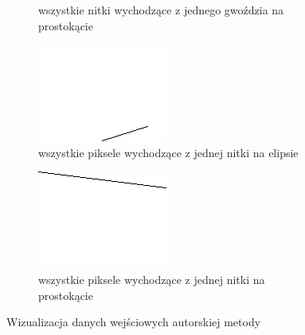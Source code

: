 \documentclass[a4paper, 12pt, polish, twoside]{extreport}
\begin{document}
\begin{figure}[H]
\begin{subfigure}{0.49\textwidth}
        \caption{wszystkie nitki wychodzące z jednego gwoździa na prostokącie}
        \label{wlasne-dane-slownikowe-4}
    \end{subfigure}
    \begin{subfigure}{0.49\textwidth}
        \centering
        \includegraphics[width = \textwidth]{img/4-mine/points-from-thread-of-elipse.png}
        \caption{wszystkie piksele wychodzące z jednej nitki na elipsie}
        \label{wlasne-dane-slownikowe-5}
    \end{subfigure}
    \begin{subfigure}{0.49\textwidth}
        \centering
        \includegraphics[width = \textwidth]{img/4-mine/points-from-thread-of-rectangle.png}
        \caption{wszystkie piksele wychodzące z jednej nitki na prostokącie}
        \label{wlasne-dane-slownikowe-6}
    \end{subfigure}
    \caption{Wizualizacja danych wejściowych autorskiej metody}
    \label{wlasne-dane-slownikowe}
    \end{figure}
    
\end{document}
